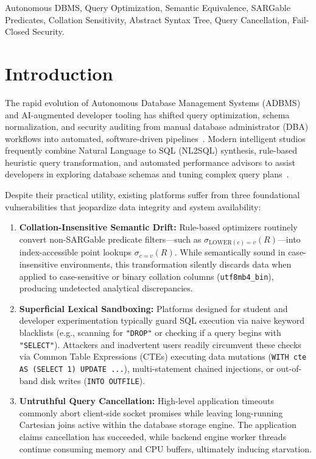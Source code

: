 \documentclass[conference]{IEEEtran}
\begin{document}
\begin{IEEEkeywords}
Autonomous DBMS, Query Optimization, Semantic Equivalence, SARGable Predicates, Collation Sensitivity, Abstract Syntax Tree, Query Cancellation, Fail-Closed Security.
\end{IEEEkeywords}

\section{Introduction}

The rapid evolution of Autonomous Database Management Systems (ADBMS) and AI-augmented developer tooling has shifted query optimization, schema normalization, and security auditing from manual database administrator (DBA) workflows into automated, software-driven pipelines~\cite{chaudhuri1998overview, leis2015good}. Modern intelligent studios frequently combine Natural Language to SQL (NL2SQL) synthesis, rule-based heuristic query transformation, and automated performance advisors to assist developers in exploring database schemas and tuning complex query plans~\cite{marcus2019neo}. 

Despite their practical utility, existing platforms suffer from three foundational vulnerabilities that jeopardize data integrity and system availability:
\begin{enumerate}
    \item \textbf{Collation-Insensitive Semantic Drift:} Rule-based optimizers routinely convert non-SARGable predicate filters—such as $\sigma_{\text{LOWER}(c) = v}(R)$—into index-accessible point lookups $\sigma_{c = v}(R)$. While semantically sound in case-insensitive environments, this transformation silently discards data when applied to case-sensitive or binary collation columns (\texttt{utf8mb4\_bin}), producing undetected analytical discrepancies.
    \item \textbf{Superficial Lexical Sandboxing:} Platforms designed for student and developer experimentation typically guard SQL execution via naive keyword blacklists (e.g., scanning for \texttt{"DROP"} or checking if a query begins with \texttt{"SELECT"}). Attackers and inadvertent users readily circumvent these checks via Common Table Expressions (CTEs) executing data mutations (\texttt{WITH cte AS (SELECT 1) UPDATE ...}), multi-statement chained injections, or out-of-band disk writes (\texttt{INTO OUTFILE}).
    \item \textbf{Untruthful Query Cancellation:} High-level application timeouts commonly abort client-side socket promises while leaving long-running Cartesian joins active within the database storage engine. The application claims cancellation has succeeded, while backend engine worker threads continue consuming memory and CPU buffers, ultimately inducing starvation.
\end{enumerate}
\end{document}
